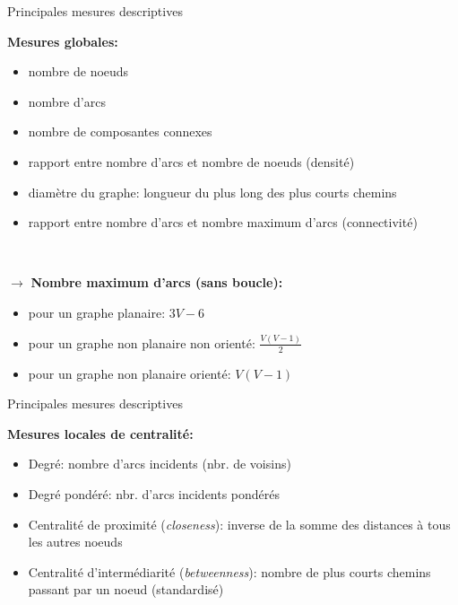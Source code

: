 \begin{frame}{Principales mesures descriptives}

\textbf{Mesures globales:}

\begin{itemize}
\item nombre de noeuds
\item nombre d’arcs
\item nombre de composantes connexes
\item rapport entre nombre d’arcs et nombre de noeuds (densité)
\item diamètre du graphe: longueur du plus long des plus courts chemins
\item rapport entre nombre d’arcs et nombre maximum d’arcs (connectivité)
\end{itemize}

~

$\rightarrow$ \textbf{Nombre maximum d’arcs (sans boucle):}

\begin{itemize}
\item pour un graphe planaire: $3V - 6$
\item pour un graphe non planaire non orienté: $\frac{V(V-1)}{2}$ 
\item pour un graphe non planaire orienté: $V(V-1)$
\end{itemize}

\end{frame}

\begin{frame}{Principales mesures descriptives}

\textbf{Mesures locales de centralité:}

\begin{itemize}
\item Degré: nombre d'arcs incidents (nbr. de voisins)
\item Degré pondéré: nbr. d’arcs incidents pondérés
\item Centralité de proximité (\textit{closeness}): inverse de la somme des distances à tous les autres noeuds
\item Centralité d'intermédiarité (\textit{betweenness}): nombre de plus courts chemins passant par un noeud (standardisé)
\end{itemize}


\end{frame}
